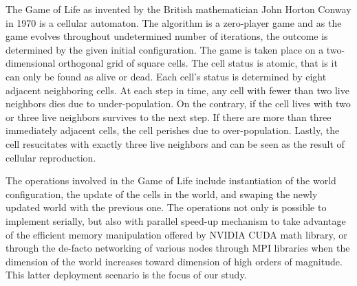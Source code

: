 
The Game of Life as invented by the British mathematician John Horton Conway in 1970 \cite{gardener1970mathematical} is a cellular automaton. The algorithm is a zero-player game and as the game evolves throughout undetermined number of iterations, the outcome is determined by the given initial configuration. The game is taken place on a two-dimensional orthogonal grid of square cells. The cell status is atomic, that is it can only be found as alive or dead. Each cell's status is determined by eight adjacent neighboring cells. At each step in time, any cell with fewer than two live neighbors dies due to under-population. On the contrary, if the cell lives with two or three live neighbors survives to the next step. If there are more than three immediately adjacent cells, the cell perishes due to over-population. Lastly, the cell resucitates with exactly three live neighbors and can be seen as the result of cellular reproduction. 

The operations involved in the Game of Life include instantiation of the world configuration, the update of the cells in the world, and swaping the newly updated world with the previous one. The operations not only is possible to implement serially, but also with parallel speed-up mechanism to take advantage of the efficient memory manipulation offered by NVIDIA CUDA math library, or through the de-facto networking of various nodes through MPI libraries when the dimension of the world increases toward dimension of high orders of magnitude. This latter deployment scenario is the focus of our study. 

